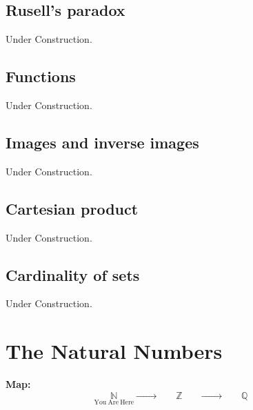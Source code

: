 \documentclass[a4paper,oneside]{book}
\begin{document}
		\section{Rusell's paradox}
			Under Construction.
		\section{Functions}
			Under Construction.
		\section{Images and inverse images}
			Under Construction.
		\section{Cartesian product}
			Under Construction.
		\section{Cardinality of sets}
			Under Construction.
	\chapter{The Natural Numbers}
		\textbf{Map:}
		\begin{equation*}
			\underset{\mathrm{You~Are~Here}}{\mathbb{N}} \xrightarrow{\quad \quad\quad}\underset{\mathrm{\phantom{\mathrm{You~Are~Here}}}}{\mathbb{Z}}\xrightarrow{\quad\quad\quad}\underset{\mathrm{\phantom{\mathrm{You~Are~Here}}}}{\mathbb{Q}}
		\end{equation*}
\end{document}
